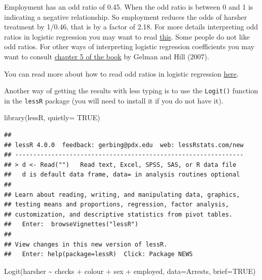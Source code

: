 \documentclass[
]{book}
\newenvironment{Shaded}{\begin{snugshade}}{\end{snugshade}}
\newcommand{\AttributeTok}[1]{\textcolor[rgb]{0.77,0.63,0.00}{#1}}
\newcommand{\ConstantTok}[1]{\textcolor[rgb]{0.00,0.00,0.00}{#1}}
\newcommand{\FunctionTok}[1]{\textcolor[rgb]{0.00,0.00,0.00}{#1}}
\newcommand{\NormalTok}[1]{#1}
\newcommand{\SpecialCharTok}[1]{\textcolor[rgb]{0.00,0.00,0.00}{#1}}
\begin{document}
Employment has an odd ratio of 0.45. When the odd ratio is between 0 and 1 is indicating a negative relationship. So employment reduces the odds of harsher treatment by 1/0.46, that is by a factor of 2.18. For more details interpreting odd ratios in logistic regression you may want to read \href{http://www.ats.ucla.edu/stat/mult_pkg/faq/general/odds_ratio.htm}{this}. Some people do not like odd ratios. For other ways of interpreting logistic regression coefficients you may want to consult \href{http://www.cambridge.org/gb/academic/subjects/statistics-probability/statistical-theory-and-methods/data-analysis-using-regression-and-multilevelhierarchical-models?format=PB}{chapter 5 of the book} by Gelman and Hill (2007).

You can read more about how to read odd ratios in logistic regression \href{https://stats.idre.ucla.edu/other/mult-pkg/faq/general/faq-how-do-i-interpret-odds-ratios-in-logistic-regression/}{here}.

Another way of getting the results with less typing is to use the \texttt{Logit()} function in the \texttt{lessR} package (you will need to install it if you do not have it).

\begin{Shaded}
\begin{Highlighting}[]
\FunctionTok{library}\NormalTok{(lessR, }\AttributeTok{quietly=} \ConstantTok{TRUE}\NormalTok{)}
\end{Highlighting}
\end{Shaded}

\begin{verbatim}
## 
## lessR 4.0.0  feedback: gerbing@pdx.edu  web: lessRstats.com/new
## ---------------------------------------------------------------
## > d <- Read("")   Read text, Excel, SPSS, SAS, or R data file
##   d is default data frame, data= in analysis routines optional
## 
## Learn about reading, writing, and manipulating data, graphics,
## testing means and proportions, regression, factor analysis,
## customization, and descriptive statistics from pivot tables.
##   Enter:  browseVignettes("lessR")
## 
## View changes in this new version of lessR.
##   Enter: help(package=lessR)  Click: Package NEWS
\end{verbatim}

\begin{Shaded}
\begin{Highlighting}[]
\FunctionTok{Logit}\NormalTok{(harsher }\SpecialCharTok{\textasciitilde{}}\NormalTok{ checks }\SpecialCharTok{+}\NormalTok{ colour }\SpecialCharTok{+}\NormalTok{ sex }\SpecialCharTok{+}\NormalTok{ employed, }\AttributeTok{data=}\NormalTok{Arrests, }\AttributeTok{brief=}\ConstantTok{TRUE}\NormalTok{)}
\end{Highlighting}
\end{Shaded}
\end{document}
